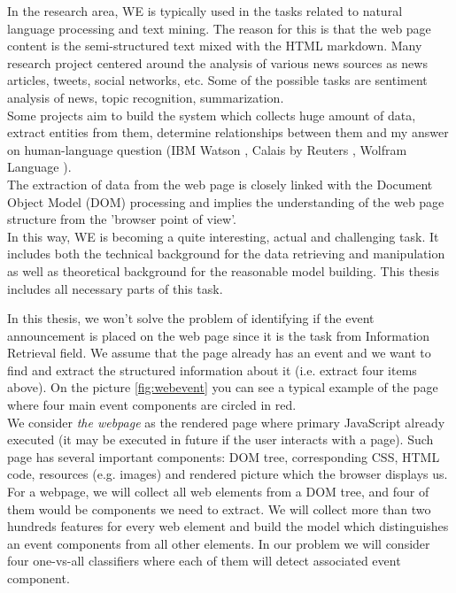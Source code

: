 In the research area, WE is typically used in the tasks related to natural language processing and text mining. The reason for this is that the web page content is the semi-structured text mixed with the HTML markdown. Many research project centered around the analysis of various news sources as news articles, tweets, social networks, etc. Some of the possible tasks are sentiment analysis of news, topic recognition, summarization. \\

Some projects aim to build the system which collects huge amount of data, extract entities from them, determine relationships between them and my answer on human-language question (IBM Watson \cite{IBMAlchemy}, Calais by Reuters \cite{Calais}, Wolfram Language \cite{Wolfram}).\\      

The extraction of data from the web page is closely linked with the Document Object Model (DOM) processing and implies the understanding of the web page structure from the 'browser point of view'. \\

In this way, WE is becoming a quite interesting, actual and challenging task. It includes both the technical background for the data retrieving and manipulation as well as theoretical background for the reasonable model building. This thesis includes all necessary parts of this task.



In this thesis, we won't solve the problem of identifying if the event announcement is placed on the web page since it is the task from Information Retrieval field. We assume that the page already has an event and we want to find and extract the structured information about it (i.e. extract four items above). On the picture \ref{fig:webevent} you can see a typical example of the page where four main event components are circled in red.\\

We consider \textit{the webpage} as the rendered page where primary JavaScript already executed (it may be executed in future if the user interacts with a page). Such page has several important components: DOM tree, corresponding CSS, HTML code, resources (e.g. images) and rendered picture which the browser displays us. \\

For a webpage, we will collect all web elements from a DOM tree, and four of them would be components we need to extract. We will collect more than two hundreds features for every web element and build the model which distinguishes an event components from all other elements. In our problem we will consider four one-vs-all classifiers where each of them will detect associated event component. 

